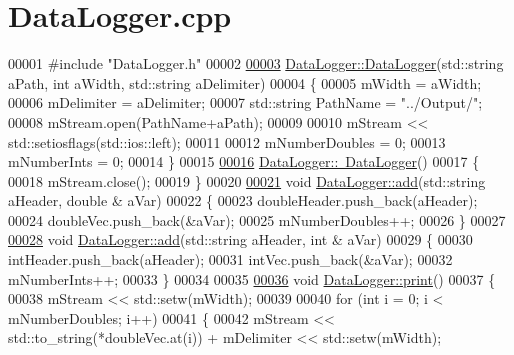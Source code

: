 \hypertarget{_data_logger_8cpp_source}{}\section{Data\+Logger.\+cpp}
\label{_data_logger_8cpp_source}

\begin{DoxyCode}
00001 \textcolor{preprocessor}{#include "DataLogger.h"}
00002 
\hyperlink{group___tools_aa95dc52c00e81fcb074ef4224d305238}{00003} \hyperlink{group___tools_aa95dc52c00e81fcb074ef4224d305238}{DataLogger::DataLogger}(std::string aPath, \textcolor{keywordtype}{int} aWidth, std::string aDelimiter)
00004 \{
00005     mWidth = aWidth;
00006     mDelimiter = aDelimiter;
00007     std::string PathName = \textcolor{stringliteral}{"../Output/"};
00008     mStream.open(PathName+aPath);
00009 
00010     mStream << std::setiosflags(std::ios::left);
00011 
00012     mNumberDoubles = 0;
00013     mNumberInts = 0;
00014 \}
00015 
\hyperlink{group___tools_a9aaff109f3e7749a0a0a0313655da50a}{00016} \hyperlink{group___tools_a9aaff109f3e7749a0a0a0313655da50a}{DataLogger::~DataLogger}()
00017 \{
00018     mStream.close();
00019 \}
00020 
\hyperlink{group___tools_a31d8ed8cfdda531f19236e214d5d931f}{00021} \textcolor{keywordtype}{void} \hyperlink{group___tools_a31d8ed8cfdda531f19236e214d5d931f}{DataLogger::add}(std::string aHeader, \textcolor{keywordtype}{double} & aVar)
00022 \{
00023     doubleHeader.push\_back(aHeader);
00024     doubleVec.push\_back(&aVar);
00025     mNumberDoubles++;
00026 \}
00027 
\hyperlink{group___tools_a9af9879fe968dee468b3e479cadf073a}{00028} \textcolor{keywordtype}{void} \hyperlink{group___tools_a31d8ed8cfdda531f19236e214d5d931f}{DataLogger::add}(std::string aHeader, \textcolor{keywordtype}{int} & aVar)
00029 \{
00030     intHeader.push\_back(aHeader);
00031     intVec.push\_back(&aVar);
00032     mNumberInts++;
00033 \}
00034 
00035 
\hyperlink{group___tools_aa1bd66fc07169787398f386d9276708b}{00036} \textcolor{keywordtype}{void} \hyperlink{group___tools_aa1bd66fc07169787398f386d9276708b}{DataLogger::print}()
00037 \{
00038     mStream << std::setw(mWidth);
00039 
00040     \textcolor{keywordflow}{for} (\textcolor{keywordtype}{int} i = 0; i < mNumberDoubles; i++)
00041     \{
00042         mStream << std::to\_string(*doubleVec.at(i)) + mDelimiter << std::setw(mWidth);

\end{DoxyCode}
